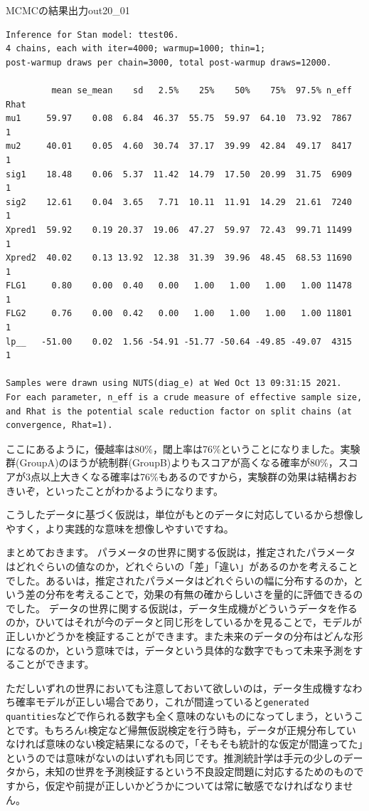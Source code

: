\documentclass{ltjsbook}
\begin{document}
\begin{SCrstan}{MCMCの結果出力}{out20_01}
    \begin{verbatim}
Inference for Stan model: ttest06.
4 chains, each with iter=4000; warmup=1000; thin=1; 
post-warmup draws per chain=3000, total post-warmup draws=12000.

         mean se_mean    sd   2.5%    25%    50%    75%  97.5% n_eff Rhat
mu1     59.97    0.08  6.84  46.37  55.75  59.97  64.10  73.92  7867    1
mu2     40.01    0.05  4.60  30.74  37.17  39.99  42.84  49.17  8417    1
sig1    18.48    0.06  5.37  11.42  14.79  17.50  20.99  31.75  6909    1
sig2    12.61    0.04  3.65   7.71  10.11  11.91  14.29  21.61  7240    1
Xpred1  59.92    0.19 20.37  19.06  47.27  59.97  72.43  99.71 11499    1
Xpred2  40.02    0.13 13.92  12.38  31.39  39.96  48.45  68.53 11690    1
FLG1     0.80    0.00  0.40   0.00   1.00   1.00   1.00   1.00 11478    1
FLG2     0.76    0.00  0.42   0.00   1.00   1.00   1.00   1.00 11801    1
lp__   -51.00    0.02  1.56 -54.91 -51.77 -50.64 -49.85 -49.07  4315    1

Samples were drawn using NUTS(diag_e) at Wed Oct 13 09:31:15 2021.
For each parameter, n_eff is a crude measure of effective sample size,
and Rhat is the potential scale reduction factor on split chains (at 
convergence, Rhat=1).
   \end{verbatim}
\end{SCrstan}

ここにあるように，優越率は80\%，閾上率は76\%ということになりました。実験群(GroupA)のほうが統制群(GroupB)よりもスコアが高くなる確率が80\%，スコアが3点以上大きくなる確率は76\%もあるのですから，実験群の効果は結構おおきいぞ，といったことがわかるようになります。

こうしたデータに基づく仮説は，単位がもとのデータに対応しているから想像しやすく，より実践的な意味を想像しやすいですね。

まとめておきます。
パラメータの世界に関する仮説は，推定されたパラメータはどれぐらいの値なのか，どれぐらいの「差」「違い」があるのかを考えることでした。あるいは，推定されたパラメータはどれぐらいの幅に分布するのか，という差の分布を考えることで，効果の有無の確からしいさを量的に評価できるのでした。
データの世界に関する仮説は，データ生成機がどういうデータを作るのか，ひいてはそれが今のデータと同じ形をしているかを見ることで，モデルが正しいかどうかを検証することができます。また未来のデータの分布はどんな形になるのか，という意味では，データという具体的な数字でもって未来予測をすることができます。

ただしいずれの世界においても注意しておいて欲しいのは，データ生成機すなわち確率モデルが正しい場合であり，これが間違っていると\verb|generated quantities|などで作られる数字も全く意味のないものになってしまう，ということです。もちろんt検定など帰無仮説検定を行う時も，データが正規分布していなければ意味のない検定結果になるので，「そもそも統計的な仮定が間違ってた」というのでは意味がないのはいずれも同じです。推測統計学は手元の少しのデータから，未知の世界を予測検証するという不良設定問題に対応するためのものですから，仮定や前提が正しいかどうかについては常に敏感でなければなりません。
\end{document}
